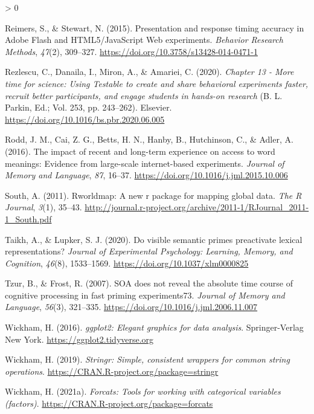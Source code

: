 \documentclass[
  english,
  man,floatsintext]{apa6}
\newlength{\cslhangindent}
\newenvironment{CSLReferences}[2] %
 {%
  \setlength{\parindent}{0pt}
  \ifodd #1 \everypar{\setlength{\hangindent}{\cslhangindent}}\ignorespaces\fi
  \ifnum #2 > 0
  \setlength{\parskip}{#2\baselineskip}
  \fi
 }%
 {}
\begin{document}
\begin{CSLReferences}{1}{0}
\leavevmode\hypertarget{ref-reimersPresentationResponseTiming2015}{}%
Reimers, S., \& Stewart, N. (2015). Presentation and response timing accuracy in {Adobe Flash} and {HTML5}/{JavaScript Web} experiments. \emph{Behavior Research Methods}, \emph{47}(2), 309--327. \url{https://doi.org/10.3758/s13428-014-0471-1}

\leavevmode\hypertarget{ref-rezlescu2020}{}%
Rezlescu, C., Danaila, I., Miron, A., \& Amariei, C. (2020). \emph{Chapter 13 - More time for science: Using Testable to create and share behavioral experiments faster, recruit better participants, and engage students in hands-on research} (B. L. Parkin, Ed.; Vol. 253, pp. 243--262). Elsevier. \url{https://doi.org/10.1016/bs.pbr.2020.06.005}

\leavevmode\hypertarget{ref-rodd2016impact}{}%
Rodd, J. M., Cai, Z. G., Betts, H. N., Hanby, B., Hutchinson, C., \& Adler, A. (2016). The impact of recent and long-term experience on access to word meanings: Evidence from large-scale internet-based experiments. \emph{Journal of Memory and Language}, \emph{87}, 16--37. \url{https://doi.org/10.1016/j.jml.2015.10.006}

\leavevmode\hypertarget{ref-R-rworldmap}{}%
South, A. (2011). Rworldmap: A new r package for mapping global data. \emph{The R Journal}, \emph{3}(1), 35--43. \url{http://journal.r-project.org/archive/2011-1/RJournal_2011-1_South.pdf}

\leavevmode\hypertarget{ref-Taikh_2020}{}%
Taikh, A., \& Lupker, S. J. (2020). Do visible semantic primes preactivate lexical representations? \emph{Journal of Experimental Psychology: Learning, Memory, and Cognition}, \emph{46}(8), 1533--1569. \url{https://doi.org/10.1037/xlm0000825}

\leavevmode\hypertarget{ref-Tzur_2007}{}%
Tzur, B., \& Frost, R. (2007). {SOA} does not reveal the absolute time course of cognitive processing in fast priming experiments{{73}}. \emph{Journal of Memory and Language}, \emph{56}(3), 321--335. \url{https://doi.org/10.1016/j.jml.2006.11.007}

\leavevmode\hypertarget{ref-R-ggplot2}{}%
Wickham, H. (2016). \emph{ggplot2: Elegant graphics for data analysis}. Springer-Verlag New York. \url{https://ggplot2.tidyverse.org}

\leavevmode\hypertarget{ref-R-stringr}{}%
Wickham, H. (2019). \emph{Stringr: Simple, consistent wrappers for common string operations}. \url{https://CRAN.R-project.org/package=stringr}

\leavevmode\hypertarget{ref-R-forcats}{}%
Wickham, H. (2021a). \emph{Forcats: Tools for working with categorical variables (factors)}. \url{https://CRAN.R-project.org/package=forcats}


\end{CSLReferences}
\end{document}
